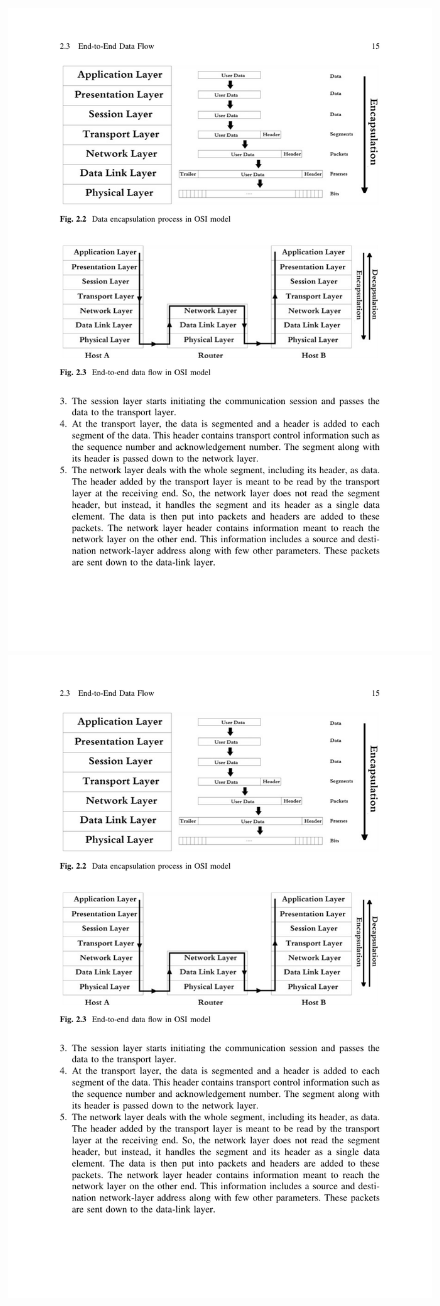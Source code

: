 \documentclass[../report.tex]{subfiles}
\begin{document}
\begin{figure}[h!]
\centering
\includegraphics[width=0.8\linewidth]{figures/encapsulation.pdf} \\
\vspace{0.5cm}
\includegraphics[width=0.8\linewidth]{figures/endtoendflow.pdf}

\end{figure}
\end{document}
